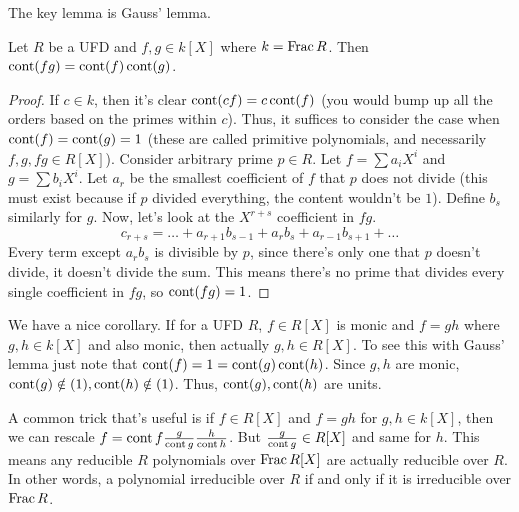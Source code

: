The key lemma is Gauss' lemma.
\begin{theorem}
    Let $R$ be a UFD and $f, g \in k[X]$ where $k = \operatorname{Frac} R$. Then $\operatorname{cont}(fg) = \operatorname{cont}(f) \operatorname{cont}(g)$.
    \begin{proof}
        If $c \in k$, then it's clear $\operatorname{cont}(cf) = c \operatorname{cont}(f)$ (you would bump up all the orders based on the primes within $c$).
        Thus, it suffices to consider the case when $\operatorname{cont}(f) = \operatorname{cont}(g) = 1$ (these are called primitive polynomials,
        and necessarily $f, g, fg \in R[X]$). 
        Consider arbitrary prime $p \in R$. Let $f = \sum a_i X^i$ and $g = \sum b_i X^i$.
        Let $a_r$ be the smallest coefficient of $f$ that $p$ does not divide (this must exist because if $p$
        divided everything, the content wouldn't be $1$). Define $b_s$ similarly for $g$. Now,
        let's look at the $X^{r+s}$ coefficient in $fg$.
        \[ c_{r+s} = \dots + a_{r + 1} b_{s - 1} + a_r b_s + a_{r - 1} b_{s + 1} + \dots \]
        Every term except $a_r b_s$ is divisible by $p$, since there's only one that $p$ doesn't divide, it doesn't divide the sum.
        This means there's no prime that divides every single coefficient in $fg$, so $\operatorname{cont}(fg) = 1$.
    \end{proof}
\end{theorem}

We have a nice corollary. If for a UFD $R$, $f \in R[X]$ is monic and $f = gh$ where $g, h \in k[X]$ and also monic,
then actually $g, h \in R[X]$. To see this with Gauss' lemma just note that $\operatorname{cont}(f) = 1 = \operatorname{cont}(g) \operatorname{cont}(h)$. Since $g, h$
are monic, $\operatorname{cont}(g) \notin (1), \operatorname{cont}(h) \notin (1)$. Thus, $\operatorname{cont}(g), \operatorname{cont}(h)$ are units.

A common trick that's useful is if $f \in R[X]$ and $f =gh$ for $g, h \in k[X]$,
then we can rescale $f = \operatorname{cont} f \frac{g}{\operatorname{cont} g} \frac{h}{\operatorname{cont} h}$. But $\frac{g}{\operatorname{cont} g} \in R[X]$ and same
for $h$. This means any reducible $R$ polynomials over $\operatorname{Frac} R[X]$ are actually reducible over $R$. In other words,
a polynomial irreducible over $R$ if and only if it is irreducible over $\operatorname{Frac} R$.

